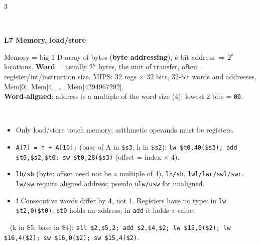\documentclass[landscape]{article}
\newcommand{\sect}[1]{\par\vspace{2pt}\noindent{\color{cur}\rule[-1.5pt]{\linewidth}{0.4pt}}\\[-7.5pt]%
  \noindent\colorbox{cur!12}{\parbox{\dimexpr\linewidth-2\fboxsep}{\color{cur}\bfseries #1}}\par\vspace{0.5pt}}
\newcommand{\sub}[1]{\par\vspace{1pt}{\color{cur}\bfseries #1}\ }
\newcommand{\key}[1]{\textbf{\color{BrickRed}#1}}
\newcommand{\warn}[1]{\par\noindent\colorbox{red!10}{\parbox{\dimexpr\linewidth-2\fboxsep}{\textcolor{red!70!black}{\textbf{!} } #1}}\par}
\newcommand{\tc}[1]{\texttt{#1}}
\begin{document}
\begin{multicols*}{3}
\sect{L7 \; Memory, load/store}
Memory = big 1-D array of bytes (\key{byte addressing}); $k$-bit address $\Rightarrow 2^k$ locations. \key{Word} = usually $2^n$ bytes, the unit of transfer, often = register/int/instruction size. MIPS: 32 regs $\times$ 32 bits, 32-bit words and addresses, Mem[0], Mem[4], \dots, Mem[4294967292].\\
\key{Word-aligned}: address is a multiple of the word size (4): lowest 2 bits = \tc{00}.\\
\\
\begin{itemize}
\item Only load/store touch memory; arithmetic operands must be registers.
\item \tc{A[7] = h + A[10];} (base of A in \tc{\$s3}, h in \tc{\$s2}): \tc{lw \$t0,40(\$s3); add \$t0,\$s2,\$t0; sw \$t0,28(\$s3)} (offset = index $\times$ 4).
\item \tc{lb/sb} (byte; offset need not be a multiple of 4), \tc{lh/sh}, \tc{lwl/lwr/swl/swr}. \tc{lw/sw} require aligned address; pseudo \tc{ulw/usw} for unaligned.
\item \warn{Consecutive words differ by \textbf{4}, not 1. Registers have no type: in \tc{lw \$t2,0(\$t0)}, \tc{\$t0} holds an address; in \tc{add} it holds a value.}
\end{itemize}
\sub{Swap v[k], v[k+1]} (k in \$5, base in \$4): \tc{sll \$2,\$5,2; add \$2,\$4,\$2; lw \$15,0(\$2); lw \$16,4(\$2); sw \$16,0(\$2); sw \$15,4(\$2)}.


\end{multicols*}
\end{document}
